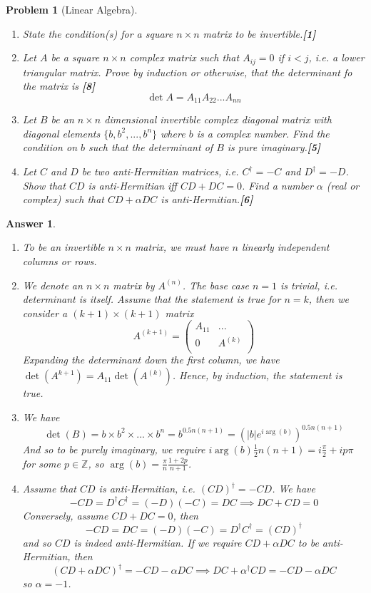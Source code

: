 \documentclass[a4paper]{article}
\newtheorem{ans}{Answer}[section]
\theoremstyle{new}
\newtheorem{qns}{Problem}[section]
\begin{document}
\newpage
\begin{qns}[Linear Algebra]\leavevmode
\begin{enumerate}[label=(\alph*)]
\item State the condition(s) for a square $n\times n$ matrix to be invertible.\hfill \textbf{[1]}
\item Let $A$ be a square $n\times n$ complex matrix such that $A_{ij}=0$ if $i<j$, i.e. a lower triangular matrix. Prove by induction or otherwise, that the determinant fo the matrix is \hfill \textbf{[8]} 
$$\det A=A_{11}A_{22}...A_{nn}$$
\item Let $B$ be an $n\times n$ dimensional invertible complex diagonal matrix with diagonal elements $\{b,b^2,...,b^n\}$ where $b$ is a complex number. Find the condition on $b$ such that the determinant of $B$ is pure imaginary.\hfill \textbf{[5]}
\item Let $C$ and $D$ be two anti-Hermitian matrices, i.e. $C^\dag=-C$ and $D^\dag=-D$. Show that $CD$ is anti-Hermitian iff $CD+DC=0$. Find a number $\alpha$ (real or complex) such that $CD+\alpha DC$ is anti-Hermitian.\hfill \textbf{[6]}
\end{enumerate}
\end{qns}
\begin{ans}\leavevmode
\begin{enumerate}[label=(\alph*)]
\item To be an invertible $n\times n$ matrix, we must have $n$ linearly independent columns or rows.
\item We denote an $n\times n$ matrix by $A^{(n)}$. The base case $n=1$ is trivial, i.e. determinant is itself. Assume that the statement is true for $n=k$, then we consider a $(k+1)\times(k+1)$ matrix
$$A^{(k+1)}=\begin{pmatrix}A_{11}&...\\0&A^{(k)}\\\end{pmatrix}$$
Expanding the determinant down the first column, we have $\det(A^{k+1})=A_{11}\det(A^{(k)})$. Hence, by induction, the statement is true.
\item We have 
$$\det(B)=b\times b^2\times...\times b^n=b^{0.5n(n+1)}=(|b|e^{i\arg(b)})^{0.5n(n+1)}$$
And so to be purely imaginary, we require $i\arg(b)\frac{1}{2}n(n+1)=i\frac{\pi}{2}+ip\pi$ for some $p\in\mathbb{Z}$, so $\arg(b)=\frac{\pi}{n}\frac{1+2p}{n+1}$.
\item Assume that $CD$ is anti-Hermitian, i.e. $(CD)^\dag=-CD$. We have 
$$-CD=D^\dag C^\dag=(-D)(-C)=DC\implies DC+CD=0$$
Conversely, assume $CD+DC=0$, then
$$-CD=DC=(-D)(-C)=D^\dag C^\dag=(CD)^\dag$$
and so $CD$ is indeed anti-Hermitian. If we require $CD+\alpha DC$ to be anti-Hermitian, then
$$(CD+\alpha DC)^\dag=-CD-\alpha DC\implies DC+\alpha^\dag CD=-CD-\alpha DC$$
so $\alpha=-1$.
\end{enumerate}
\end{ans}
\end{document}
